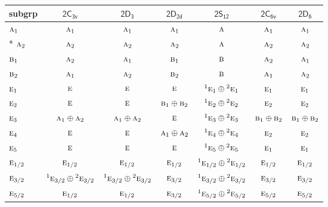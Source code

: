 \documentclass[10pt,a4paper]{article}
\numberwithin{equation}{section}
\newcommand{\grp}[1]{\mathsf{#1}}
\newcommand{\irr}[1]{\text{\normalfont\scshape #1}}
\newcommand{\conjpair}[1]{{}^{#1}}
\begin{document}
{\small\begin{longtable}{@{}lcccccc@{}}\toprule
subgrp & \href{2C3v.pdf}{$\grp{2C_{3v}}$} & \href{2D3.pdf}{$\grp{2D_{3}}$} & \href{2D2d.pdf}{$\grp{2D_{2d}}$} & \href{2S12.pdf}{$\grp{2S_{12}}$} & \href{2C6v.pdf}{$\grp{2C_{6v}}$} & \href{2D6.pdf}{$\grp{2D_{6}}$}\\\midrule\endhead
\bottomrule\endfoot\endlastfoot
$\irr{a}_{1}$ & $\irr{a}_{1}$ & $\irr{a}_{1}$ & $\irr{a}_{1}$ & $\irr{a}$ & $\irr{a}_{1}$ & $\irr{a}_{1}$\\*
$\irr{a}_{2}$ & $\irr{a}_{2}$ & $\irr{a}_{2}$ & $\irr{a}_{2}$ & $\irr{a}$ & $\irr{a}_{2}$ & $\irr{a}_{2}$\\
$\irr{b}_{1}$ & $\irr{a}_{2}$ & $\irr{a}_{1}$ & $\irr{b}_{1}$ & $\irr{b}$ & $\irr{a}_{2}$ & $\irr{a}_{1}$\\
$\irr{b}_{2}$ & $\irr{a}_{1}$ & $\irr{a}_{2}$ & $\irr{b}_{2}$ & $\irr{b}$ & $\irr{a}_{1}$ & $\irr{a}_{2}$\\
$\irr{e}_{1}$ & $\irr{e}$ & $\irr{e}$ & $\irr{e}$ & $\conjpair{1}\irr{e}_{1}\oplus \conjpair{2}\irr{e}_{1}$ & $\irr{e}_{1}$ & $\irr{e}_{1}$\\
$\irr{e}_{2}$ & $\irr{e}$ & $\irr{e}$ & $\irr{b}_{1}\oplus \irr{b}_{2}$ & $\conjpair{1}\irr{e}_{2}\oplus \conjpair{2}\irr{e}_{2}$ & $\irr{e}_{2}$ & $\irr{e}_{2}$\\
$\irr{e}_{3}$ & $\irr{a}_{1}\oplus \irr{a}_{2}$ & $\irr{a}_{1}\oplus \irr{a}_{2}$ & $\irr{e}$ & $\conjpair{1}\irr{e}_{3}\oplus \conjpair{2}\irr{e}_{3}$ & $\irr{b}_{1}\oplus \irr{b}_{2}$ & $\irr{b}_{1}\oplus \irr{b}_{2}$\\
$\irr{e}_{4}$ & $\irr{e}$ & $\irr{e}$ & $\irr{a}_{1}\oplus \irr{a}_{2}$ & $\conjpair{1}\irr{e}_{4}\oplus \conjpair{2}\irr{e}_{4}$ & $\irr{e}_{2}$ & $\irr{e}_{2}$\\
$\irr{e}_{5}$ & $\irr{e}$ & $\irr{e}$ & $\irr{e}$ & $\conjpair{1}\irr{e}_{5}\oplus \conjpair{2}\irr{e}_{5}$ & $\irr{e}_{1}$ & $\irr{e}_{1}$\\
$\irr{e}_{1/2}$ & $\irr{e}_{1/2}$ & $\irr{e}_{1/2}$ & $\irr{e}_{1/2}$ & $\conjpair{1}\irr{e}_{1/2}\oplus \conjpair{2}\irr{e}_{1/2}$ & $\irr{e}_{1/2}$ & $\irr{e}_{1/2}$\\
$\irr{e}_{3/2}$ & $\conjpair{1}\irr{e}_{3/2}\oplus \conjpair{2}\irr{e}_{3/2}$ & $\conjpair{1}\irr{e}_{3/2}\oplus \conjpair{2}\irr{e}_{3/2}$ & $\irr{e}_{3/2}$ & $\conjpair{1}\irr{e}_{3/2}\oplus \conjpair{2}\irr{e}_{3/2}$ & $\irr{e}_{3/2}$ & $\irr{e}_{3/2}$\\
$\irr{e}_{5/2}$ & $\irr{e}_{1/2}$ & $\irr{e}_{1/2}$ & $\irr{e}_{3/2}$ & $\conjpair{1}\irr{e}_{5/2}\oplus \conjpair{2}\irr{e}_{5/2}$ & $\irr{e}_{5/2}$ & $\irr{e}_{5/2}$\\

\end{longtable}}
\end{document}
